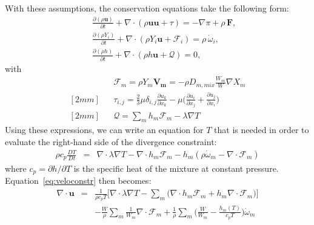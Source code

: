 With these assumptions, the conservation equations take the following form:
\begin{eqnarray}
&&\frac{\partial (\rho \boldsymbol{u})}{\partial t} + 
\nabla \cdot \left(\rho  \boldsymbol{u} \boldsymbol{u} + \tau \right)
= -\nabla \pi + \rho \, \boldsymbol{F}  ,
\nonumber
\\
&&\frac{\partial (\rho Y_i)}{\partial t} +
\nabla \cdot \left( \rho Y_i \boldsymbol{u} + \boldsymbol{\mathcal{F}}_{i} \right)
= \rho \, \dot{\omega}_i,
\label{eq:pelelm}
\\
&&\frac{ \partial (\rho h)}{ \partial t} +
\nabla \cdot \left( \rho h \boldsymbol{u} + \boldsymbol{\mathcal{Q}} \right) = 0 ,
\nonumber
\end{eqnarray}
with
 \begin{eqnarray*}
&&\boldsymbol{\mathcal{F}}_{m} = \rho Y_m \boldsymbol{V_m} = - \rho D_{m,mix} \frac{W_m}{W}  \nabla X_m
\\ [2mm]
&&\tau_{i,j} = \frac{2}{3} \mu \delta_{i,j} \frac{\partial {u_k}}{\partial x_k} - \mu \Big(\frac{\partial  u_i}{\partial x_j} + \frac{\partial  u_j}{\partial x_i}\Big)
\\ [2mm]
&&\boldsymbol{\mathcal{Q}} =  \sum_m h_m \boldsymbol{\mathcal{F}}_{m}  - \lambda \nabla T
 \end{eqnarray*}
 Using these expressions, we can write an equation for $T$ that is needed in order to evaluate the right-hand side of the divergence constraint:
 \begin{eqnarray}
   \rho c_p \frac{DT}{Dt} &=& \nabla \cdot \lambda \nabla T - \nabla \cdot h_m \boldsymbol{\mathcal{F}}_{m}
   -h_m (\rho \dot\omega_m - \nabla \cdot \boldsymbol{\mathcal{F}}_{m} )
   \label{eq:T}
 \end{eqnarray}
where $c_p = \partial h/\partial T$ is the specific heat of the mixture at constant pressure. Equation~\ref{eq:veloconstr} then becomes:
\begin{eqnarray}
  \nabla \cdot \boldsymbol{u} &=&\frac{1}{\rho c_{p} T}\Big[ \nabla \cdot \lambda \nabla T
  - \sum_m \Big( \nabla \cdot h_m \boldsymbol{\mathcal{F}}_{m} + h_m \nabla \cdot \boldsymbol{\mathcal{F}}_{m} \Big) \Big] \nonumber
\\
&&- \frac{W}{\rho} \sum_m \frac{1}{W_m} \nabla \cdot \boldsymbol{\mathcal{F}}_{m} + \frac{1}{\rho} \sum_m \Big( \frac{W}{W_m} -\frac{h_m(T)}{c_{p} T} \Big)\dot{\omega}_m
\label{eq:igldivu}
\end{eqnarray}



